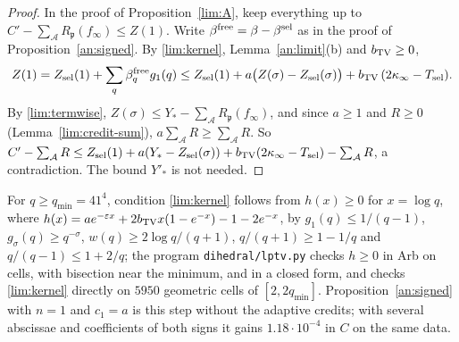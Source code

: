 \begin{proof}
In the proof of Proposition~\ref{lim:A}, keep everything up to
$C'-\sum_{\mathcal A}R_{\mathfrak p}(f_\infty)\le Z(1)$. Write $\beta^{\rm
free}=\beta-\beta^{\rm sel}$ as in the proof of Proposition~\ref{an:signed}.
By \eqref{lim:kernel}, Lemma~\ref{an:limit}(b) and $b_{\rm TV}\ge0$,
\[
 Z(1)=Z_{\rm sel}(1)+\sum_q\beta^{\rm free}_qg_1(q)
 \le Z_{\rm sel}(1)+a\bigl(Z(\sigma)-Z_{\rm sel}(\sigma)\bigr)+b_{\rm TV}\,(2\kappa_\infty-T_{\rm sel}).
\]
By \eqref{lim:termwise}, $Z(\sigma)\le Y_*-\sum_{\mathcal A}R_{\mathfrak
p}(f_\infty)$, and since $a\ge1$ and $R\ge0$ (Lemma~\ref{lim:credit-sum}), $a\sum_{\mathcal A}R\ge
\sum_{\mathcal A}R$. So $C'-\sum_{\mathcal A}R\le Z_{\rm sel}(1)+a(Y_*-Z_{\rm
sel}(\sigma))+b_{\rm TV}(2\kappa_\infty-T_{\rm sel})-\sum_{\mathcal A}R$, a
contradiction. The bound $Y'_*$ is not needed.
\end{proof}

\begin{remark}\label{lim:kernel-check}
For $q\ge q_{\min}=41^4$, condition \eqref{lim:kernel} follows from $h(x)\ge0$
for $x=\log q$, where $h(x)=ae^{-\varepsilon x}+2b_{\rm TV}x(1-e^{-x})-1-2e^{-x}$,
by $g_1(q)\le1/(q-1)$, $g_\sigma(q)\ge q^{-\sigma}$, $w(q)\ge2\log q/(q+1)$,
$q/(q+1)\ge1-1/q$ and $q/(q-1)\le1+2/q$; the program \texttt{dihedral/lptv.py}
checks $h\ge0$ in Arb on cells, with bisection near the minimum, and in a
closed form, and checks \eqref{lim:kernel} directly on $5950$ geometric cells
of $[2,2q_{\min}]$. Proposition~\ref{an:signed} with $n=1$ and $c_1=a$ is this
step without the adaptive credits; with several abscissae and coefficients of
both signs it gains $1.18\cdot10^{-4}$ in $C$ on the same data.
\end{remark}

